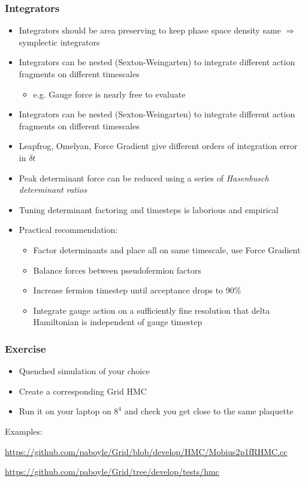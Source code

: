 \documentclass[pdf,ps,8pt]{beamer}
\newcommand{\link}[1]{\href{#1}{ {\color{blue} #1} }}
\begin{document}
\begin{frame}[fragile]\small\frametitle{ Integrators }
\begin{itemize}
\item Integrators should be area preserving to keep phase space density same $\Rightarrow$ symplectic integrators
\item Integrators can be nested (Sexton-Weingarten) to integrate different action fragments on different timescales
\begin{itemize}
\item e.g. Gauge force is nearly free to evaluate
\end{itemize}
\item Integrators can be nested (Sexton-Weingarten) to integrate different action fragments on different timescales
\item Leapfrog, Omelyan, Force Gradient give different orders of integration error in $\delta t$ 
\item Peak determinant force can be reduced using a series of \emph{Hasenbusch determinant ratios}
\item Tuning determinant factoring and timesteps is laborious and empirical
\item Practical recommendation: 
\begin{itemize}
\item Factor determinants and place all on same timescale, use Force Gradient
\item Balance forces between pseudofermion factors
\item Increase fermion timestep until acceptance drops to 90\%
\item Integrate gauge action on a sufficiently fine resolution that delta Hamiltonian is independent of gauge timestep
\end{itemize}
\end{itemize}
\end{frame}

\begin{frame}[fragile]\small\frametitle{Exercise}

\begin{itemize} 
\item Quenched simulation of your choice
\item Create a corresponding Grid HMC
\item Run it on your laptop on $8^4$ and check you get close to the same plaquette
\end{itemize}

Examples:

\link{https://github.com/paboyle/Grid/blob/develop/HMC/Mobius2p1fRHMC.cc}

\link{https://github.com/paboyle/Grid/tree/develop/tests/hmc}

\end{frame}
\end{document}
